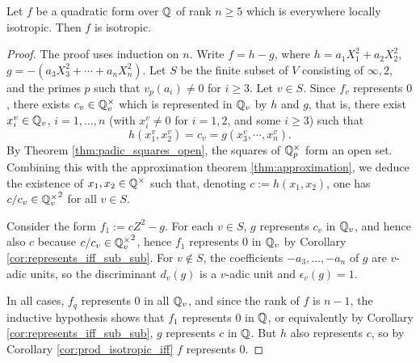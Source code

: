 \begin{lemma}\label{lem:isotr_of_five_le_rk}
\leanok
Let $f$ be a quadratic form over $\mathbb{Q}$ of rank $n \ge 5$ which is everywhere locally isotropic. Then $f$ is isotropic.
\end{lemma}
\begin{proof}
The proof uses induction on $n$. Write $f = h - g$, where $h = a_1X_1^2 + a_2X_2^2$, $g = -(a_3X_3^2 + \cdots + a_nX_n^2)$.
Let $S$ be the finite subset of $V$ consisting of $\infty, 2$, and the primes $p$ such that $v_p(a_i) \ne 0$ for $i \ge 3$.
Let $v \in S$. Since $f_v$ represents $0$, there exists $c_v \in \mathbb{Q}_v^\times$ which is represented in $\mathbb{Q}_v$ by $h$ and $g$, that is, there exist $x_i^v \in \mathbb{Q}_v$, $i=1, \dots, n$ (with $x_i^v \ne 0$ for $i=1, 2$, and some $i \ge 3$) such that
\[ h(x_1^v, x_2^v) = c_v = g(x_3^v, \cdots, x_n^v).\]
By  Theorem \ref{thm:padic_squares_open}, the squares of $\mathbb{Q}_p^\times$ form an open set. Combining this with the approximation theorem \ref{thm:approximation}, we deduce the existence of $x_1, x_2 \in \mathbb{Q}^\times$ such that, denoting $c := h(x_1, x_2)$, one has $c/c_v \in {\mathbb{Q}_v^\times}^2$ for all $v \in S$.

Consider the form $f_1 := cZ^2 - g$. For each $v \in S$, $g$ represents $c_v$ in $\mathbb{Q}_v$, and hence also $c$ because $c/c_v \in {\mathbb{Q}_v^\times}^2$, hence $f_1$ represents $0$ in $\mathbb{Q}_v$ by Corollary \ref{cor:represents_iff_sub_sub}. For $v \notin S$, the coefficients $-a_3, \dots, -a_n$ of $g$ are $v$-adic units, so the discriminant $d_v(g)$ is a $v$-adic unit and $\epsilon_v(g)=1$.

In all cases, $f_q$ represents $0$ in all $\mathbb{Q}_v$, and since the rank of $f$ is $n-1$, the inductive hypothesis shows that $f_1$ represents $0$ in $\mathbb{Q}$, or equivalently by Corollary \ref{cor:represents_iff_sub_sub}, $g$ represents $c$ in $\mathbb{Q}$. But $h$ also represents $c$, so  by Corollary \ref{cor:prod_isotropic_iff} $f$ represents $0$.

\end{proof}
